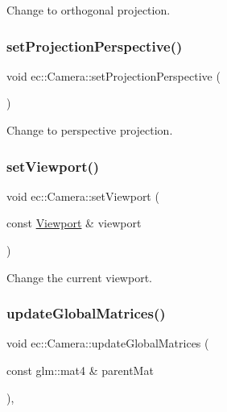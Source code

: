 Change to orthogonal projection. 

\mbox{\label{classec_1_1_camera_af3544fbe030aadcd6bdfef8cb94e7b5c}} 
\subsubsection{\texorpdfstring{set\+Projection\+Perspective()}{setProjectionPerspective()}}
{\footnotesize\ttfamily void ec\+::\+Camera\+::set\+Projection\+Perspective (\begin{DoxyParamCaption}{ }\end{DoxyParamCaption})}



Change to perspective projection. 

\mbox{\label{classec_1_1_camera_a3fc6f03041f6c0ee897c9596039d424d}} 
\subsubsection{\texorpdfstring{set\+Viewport()}{setViewport()}}
{\footnotesize\ttfamily void ec\+::\+Camera\+::set\+Viewport (\begin{DoxyParamCaption}\item[{const \mbox{\hyperlink{classec_1_1_viewport}{Viewport}} \&}]{viewport }\end{DoxyParamCaption})}



Change the current viewport. 

\mbox{\label{classec_1_1_camera_a1661dae4666cf50e697603904c96df6a}} 
\subsubsection{\texorpdfstring{update\+Global\+Matrices()}{updateGlobalMatrices()}}
{\footnotesize\ttfamily void ec\+::\+Camera\+::update\+Global\+Matrices (\begin{DoxyParamCaption}\item[{const glm\+::mat4 \&}]{parent\+Mat }\end{DoxyParamCaption})\hspace{0.3cm}{\ttfamily [override]}, {\ttfamily [virtual]}}



